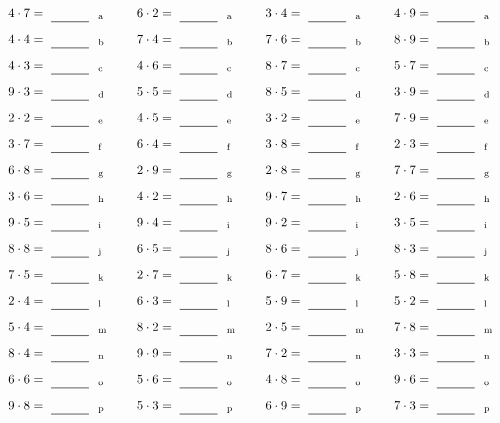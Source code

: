 \documentclass
[
  draft    = true,
  fontsize = 11pt,
  parskip  = half-
]
{scrartcl}
\begin{document}
\par\vfill\par
\begin{align*}
    \pline{4\cdot7}&=\rline{a}
  & \pline{6\cdot2}&=\rline{a}
  & \pline{3\cdot4}&=\rline{a}
  & \pline{4\cdot9}&=\rline{a} \\[1ex]
    \pline{4\cdot4}&=\rline{b}
  & \pline{7\cdot4}&=\rline{b}
  & \pline{7\cdot6}&=\rline{b}
  & \pline{8\cdot9}&=\rline{b} \\[1ex]
    \pline{4\cdot3}&=\rline{c}
  & \pline{4\cdot6}&=\rline{c}
  & \pline{8\cdot7}&=\rline{c}
  & \pline{5\cdot7}&=\rline{c} \\[1ex]
    \pline{9\cdot3}&=\rline{d}
  & \pline{5\cdot5}&=\rline{d}
  & \pline{8\cdot5}&=\rline{d}
  & \pline{3\cdot9}&=\rline{d} \\[1ex]
    \pline{2\cdot2}&=\rline{e}
  & \pline{4\cdot5}&=\rline{e}
  & \pline{3\cdot2}&=\rline{e}
  & \pline{7\cdot9}&=\rline{e} \\[1ex]
    \pline{3\cdot7}&=\rline{f}
  & \pline{6\cdot4}&=\rline{f}
  & \pline{3\cdot8}&=\rline{f}
  & \pline{2\cdot3}&=\rline{f} \\[1ex]
    \pline{6\cdot8}&=\rline{g}
  & \pline{2\cdot9}&=\rline{g}
  & \pline{2\cdot8}&=\rline{g}
  & \pline{7\cdot7}&=\rline{g} \\[1ex]
    \pline{3\cdot6}&=\rline{h}
  & \pline{4\cdot2}&=\rline{h}
  & \pline{9\cdot7}&=\rline{h}
  & \pline{2\cdot6}&=\rline{h} \\[1ex]
    \pline{9\cdot5}&=\rline{i}
  & \pline{9\cdot4}&=\rline{i}
  & \pline{9\cdot2}&=\rline{i}
  & \pline{3\cdot5}&=\rline{i} \\[1ex]
    \pline{8\cdot8}&=\rline{j}
  & \pline{6\cdot5}&=\rline{j}
  & \pline{8\cdot6}&=\rline{j}
  & \pline{8\cdot3}&=\rline{j} \\[1ex]
    \pline{7\cdot5}&=\rline{k}
  & \pline{2\cdot7}&=\rline{k}
  & \pline{6\cdot7}&=\rline{k}
  & \pline{5\cdot8}&=\rline{k} \\[1ex]
    \pline{2\cdot4}&=\rline{l}
  & \pline{6\cdot3}&=\rline{l}
  & \pline{5\cdot9}&=\rline{l}
  & \pline{5\cdot2}&=\rline{l} \\[1ex]
    \pline{5\cdot4}&=\rline{m}
  & \pline{8\cdot2}&=\rline{m}
  & \pline{2\cdot5}&=\rline{m}
  & \pline{7\cdot8}&=\rline{m} \\[1ex]
    \pline{8\cdot4}&=\rline{n}
  & \pline{9\cdot9}&=\rline{n}
  & \pline{7\cdot2}&=\rline{n}
  & \pline{3\cdot3}&=\rline{n} \\[1ex]
    \pline{6\cdot6}&=\rline{o}
  & \pline{5\cdot6}&=\rline{o}
  & \pline{4\cdot8}&=\rline{o}
  & \pline{9\cdot6}&=\rline{o} \\[1ex]
    \pline{9\cdot8}&=\rline{p}
  & \pline{5\cdot3}&=\rline{p}
  & \pline{6\cdot9}&=\rline{p}
  & \pline{7\cdot3}&=\rline{p}
\end{align*}
\end{document}
